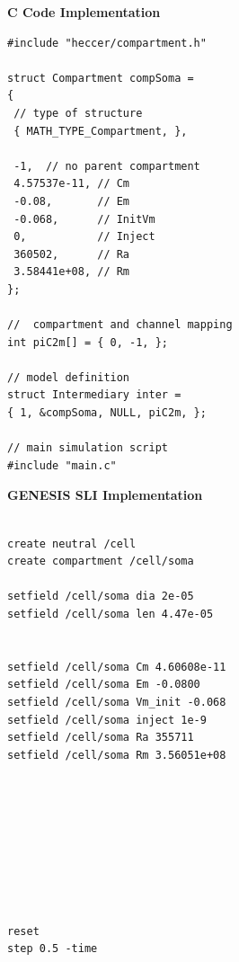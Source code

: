 \documentclass[10pt]{article}
\begin{document}
{ 
\vspace*{1mm} 
\begin{minipage}{1\linewidth}
    
\begin{minipage}[t]{.50\linewidth}
\vspace*{1mm}

{\bf C Code Implementation}
\begin{verbatim}
#include "heccer/compartment.h"

struct Compartment compSoma =
{
 // type of structure
 { MATH_TYPE_Compartment, },

 -1,  // no parent compartment
 4.57537e-11, // Cm
 -0.08,       // Em
 -0.068,      // InitVm
 0,           // Inject
 360502,      // Ra
 3.58441e+08, // Rm
};

//  compartment and channel mapping
int piC2m[] = { 0, -1, };

// model definition
struct Intermediary inter =
{ 1, &compSoma, NULL, piC2m, };

// main simulation script
#include "main.c"

\end{verbatim}
\end{minipage}
\vspace*{2mm} 
\begin{minipage}[t]{.50\linewidth}
\vspace*{1mm} 

{\bf GENESIS SLI Implementation}
\begin{verbatim}

create neutral /cell
create compartment /cell/soma

setfield /cell/soma dia 2e-05
setfield /cell/soma len 4.47e-05


setfield /cell/soma Cm 4.60608e-11
setfield /cell/soma Em -0.0800
setfield /cell/soma Vm_init -0.068
setfield /cell/soma inject 1e-9
setfield /cell/soma Ra 355711
setfield /cell/soma Rm 3.56051e+08









reset
step 0.5 -time
\end{verbatim}
    \end{minipage}
  \end{minipage}
    \vspace*{1mm}
}
\end{document}
